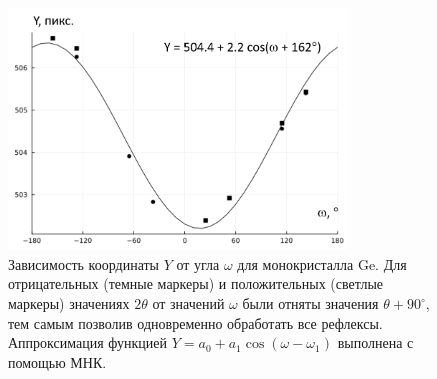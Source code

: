 \documentclass[a4paper,14pt]{extarticle}
\newcommand{\degree}{^\circ}
\newcounter{x}
\begin{document}
\begin{figure}[ht!]
    \centering
    \includegraphics[width=0.8\textwidth]{eccentrGe.png}
    \caption{Зависимость координаты $Y$ от угла $\omega$ для монокристалла Ge. Для отрицательных (темные маркеры) и положительных (светлые маркеры) значениях $2\theta$ от значений $\omega$ были отняты значения $\theta + 90\degree$, тем самым позволив одновременно обработать все рефлексы. Аппроксимация функцией $Y = a_0 + a_1 \cos(\omega - \omega_1)$ выполнена с помощью МНК.}
    \label{fig:eccentrGe}
\end{figure}

\newpage
\printbibliography%
\end{document}
